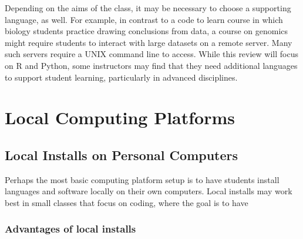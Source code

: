 Depending on the aims of the class, it may be necessary to choose a supporting language, as well.
For example, in contrast to a code to learn course in which biology students practice drawing conclusions from data, a course on genomics might require students to interact with large datasets on a remote server.
Many such servers require a UNIX command line to access.
While this review will focus on R and Python, some instructors may find that they need additional languages to support student learning, particularly in advanced disciplines.



{}

\section{Local Computing Platforms}

\subsection{Local Installs on Personal Computers}\label{subsect:Local Installs}

Perhaps the most basic computing platform setup is to have students install languages and software locally on their own computers. 
Local installs may work best in small classes that focus on 
coding, where the goal is to have 

\subsubsection{Advantages of local installs}

